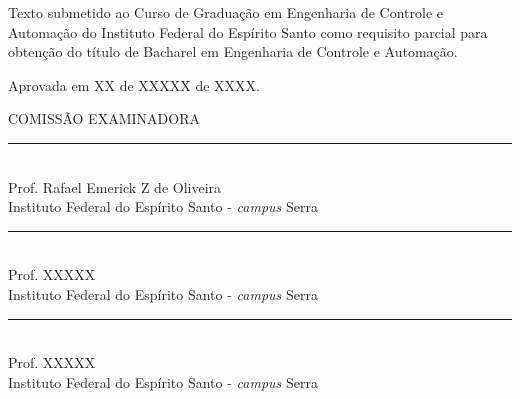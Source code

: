 {
    \center          
    {\large\MakeUppercase{\imprimirautor}}\par
    \vfill
    {\bfseries\large\MakeUppercase\imprimirtitulo}\par
    \vspace{10 mm}
    \hspace{.35\textwidth}
    \begin{minipage}{.6\textwidth}
        \SingleSpacing
        Texto submetido ao Curso de Graduação em Engenharia de Controle e Automação do Instituto Federal do Espírito Santo como requisito parcial para obtenção do título de Bacharel em Engenharia de Controle e Automação. 
    \end{minipage}
    
    \vspace{1.5cm}
    
    Aprovada em XX de XXXXX de XXXX.
    
    \vspace{1.0cm}
    
    \MakeUppercase{Comissão Examinadora}
    
    \vspace{1.0cm}
    
    \rule{12cm}{1pt} \\
    Prof. Rafael Emerick Z de Oliveira \\
    Instituto Federal do Espírito Santo - \textit{campus} Serra
    
    \vspace{1.0cm}
    \rule{12cm}{1pt} \\
    Prof. XXXXX \\
    Instituto Federal do Espírito Santo - \textit{campus} Serra
    
    \vspace{1.0cm}
    \rule{12cm}{1pt} \\
    Prof. XXXXX \\
    Instituto Federal do Espírito Santo - \textit{campus} Serra
    
    
    \vfill 
    \vfill
    {\large\MakeUppercase\imprimirlocal}\par
    {\large\imprimirdata}\par
}